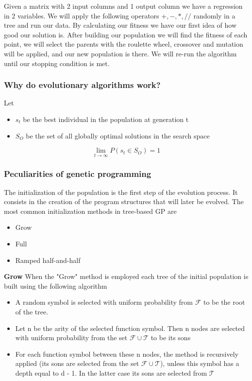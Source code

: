 \vspace{10pt}

Given a matrix with 2 input columns and 1 output column we have a regression in 2 variables. We will apply the following operators ${+, -, *, //}$ randomly in a tree and run our data. By calculating our fitness we have our first idea of how good our solution is. After building our population we will find the fitness of each point, we will select the parents with the roulette wheel, crossover and mutation will be applied, and our new population is there. We will re-run the algorithm until our stopping condition is met. 

\subsubsection{Why do evolutionary algorithms work?}

Let 

\begin{itemize}
    \item $s_t$ be the best individual in the population at generation t
    \item $S_O$ be the set of all globally optimal solutions in the search space
\end{itemize}

\[
\lim_{t \to \infty} P(s_t \in S_O) = 1
\]


\subsubsection{Peculiarities of genetic programming}

The initialization of the population is the first step of the evolution process. It consists in the creation of the program structures that will later be evolved. The most common initialization methods in tree-based GP are 

\begin{itemize}
    \item Grow
    \item Full
    \item Ramped half-and-half
\end{itemize}

\vspace{10pt}

\textbf{Grow}
When the "Grow" method is employed each tree of the initial population is built using the following algorithm

\begin{itemize}
    \item A random symbol is selected with uniform probability from $\mathcal{F}$ to be the root of the tree. 
    \item Let n be the arity of the selected function symbol. Then n nodes are selected with uniform probability from the set $\mathcal{F} \cup \mathcal{T}$ to be its sons
    \item For each function symbol between these n nodes, the method is recursively applied (its sons are selected from the set $\mathcal{F} \cup \mathcal{T}$), unless this symbol has a depth equal to d - 1. In the latter case its sons are selected from $\mathcal{T}$
\end{itemize}

